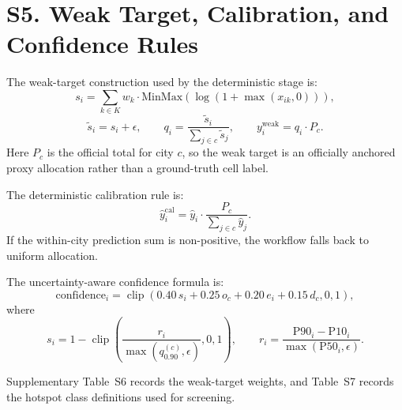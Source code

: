 \section{S5. Weak Target, Calibration, and Confidence Rules}

The weak-target construction used by the deterministic stage is:
\[
s_i = \sum_{k \in K} w_k \cdot \mathrm{MinMax}\!\left(\log\!\left(1 + \max(x_{ik}, 0)\right)\right),
\]
\[
\tilde{s}_i = s_i + \epsilon,
\qquad
q_i = \frac{\tilde{s}_i}{\sum_{j \in c} \tilde{s}_j},
\qquad
y_i^{\mathrm{weak}} = q_i \cdot P_c.
\]
Here $P_c$ is the official total for city $c$, so the weak target is an officially anchored proxy allocation rather than a ground-truth cell label.

The deterministic calibration rule is:
\[
\hat{y}_i^{\mathrm{cal}} = \hat{y}_i \cdot \frac{P_c}{\sum_{j \in c} \hat{y}_j}.
\]
If the within-city prediction sum is non-positive, the workflow falls back to uniform allocation.

The uncertainty-aware confidence formula is:
\[
\mathrm{confidence}_i =
\operatorname{clip}\!\left(
0.40\,s_i +
0.25\,o_c +
0.20\,e_i +
0.15\,d_c, 0, 1
\right),
\]
where
\[
s_i = 1 - \operatorname{clip}\!\left(
\frac{r_i}{\max(q_{0.90}^{(c)},\epsilon)}, 0, 1
\right),
\qquad
r_i = \frac{\mathrm{P90}_i - \mathrm{P10}_i}{\max(\mathrm{P50}_i,\epsilon)}.
\]

Supplementary Table~S6 records the weak-target weights, and Table~S7 records the hotspot class definitions used for screening.





